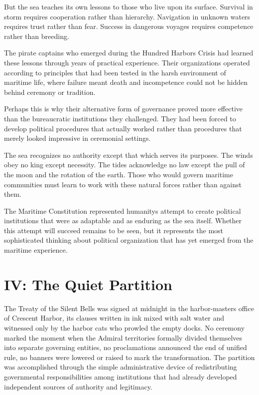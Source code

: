 But the sea teaches its own lessons to those who live upon its surface.
Survival in storm requires cooperation rather than hierarchy. Navigation
in unknown waters requires trust rather than fear. Success in dangerous
voyages requires competence rather than breeding.

The pirate captains who emerged during the Hundred Harbors Crisis had
learned these lessons through years of practical experience. Their
organizations operated according to principles that had been tested in
the harsh environment of maritime life, where failure meant death and
incompetence could not be hidden behind ceremony or tradition.

Perhaps this is why their alternative form of governance proved more
effective than the bureaucratic institutions they challenged. They had
been forced to develop political procedures that actually worked rather
than procedures that merely looked impressive in ceremonial settings.

The sea recognizes no authority except that which serves its purposes.
The winds obey no king except necessity. The tides acknowledge no law
except the pull of the moon and the rotation of the earth. Those who
would govern maritime communities must learn to work with these natural
forces rather than against them.

The Maritime Constitution represented humanity\textquotesingle s attempt
to create political institutions that were as adaptable and as enduring
as the sea itself. Whether this attempt will succeed remains to be seen,
but it represents the most sophisticated thinking about political
organization that has yet emerged from the maritime experience.

\chapter{IV: The Quiet Partition}\label{arc-iv-the-quiet-partition}

The Treaty of the Silent Bells was signed at midnight in the
harbor-master\textquotesingle s office of Crescent Harbor, its clauses
written in ink mixed with salt water and witnessed only by the harbor
cats who prowled the empty docks. No ceremony marked the moment when the
Admiral territories formally divided themselves into separate governing
entities, no proclamations announced the end of unified rule, no banners
were lowered or raised to mark the transformation. The partition was
accomplished through the simple administrative device of redistributing
governmental responsibilities among institutions that had already
developed independent sources of authority and legitimacy.

